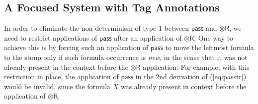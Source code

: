 \documentclass[submission,copyright,creativecommons]{eptcs}
\theoremstyle{definition}
\newcommand{\tr}{\otimes \mathsf{R}}
\newcommand{\lright}{{\multimap}\mathsf{R}}
\newcommand{\lleft}{{\multimap}\mathsf{L}}
\newcommand{\pass}{\mathsf{pass}}
\newcommand{\ax}{\mathsf{ax}}
\newcommand{\ot}{\otimes}
\newcommand{\lolli}{\multimap}
\newcommand{\RI}{\mathsf{RI}}
\newcommand{\LI}{\mathsf{LI}}
\newcommand{\Pass}{\mathsf{P}}
\newcommand{\F}{\mathsf{F}}
\newcommand{\NMILL}{\texttt{NMILL}}
\newcommand{\SkNMILL}{\NMILL\textsuperscript{\textit{s}}}
\begin{document}
%

\subsection{A Focused System with Tag Annotations}\label{sec:tag}

In order to eliminate the non-determinism of type 1 between $\pass$ and $\tr$, we need to restrict applications of $\pass$ after an application of $\tr$. 
One way to achieve this is by forcing such an application of $\pass$ to move the leftmost formula to the stoup only if such formula occurrence is \emph{new}, in the sense that it was not already present in the context before the $\tr$ application. For example, with this restriction in place, the application of $\pass$ in the 2nd derivation of (\ref{eq:passtr}) would be invalid, since the formula $X$ was already present in context before the application of $\tr$.
\end{document}
